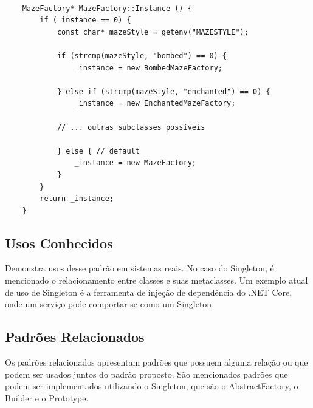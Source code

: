 \begin{lstlisting}[caption={Exemplo de Singleton com subclasses},label=singletonsub]
    
    MazeFactory* MazeFactory::Instance () {
        if (_instance == 0) {
            const char* mazeStyle = getenv("MAZESTYLE");

            if (strcmp(mazeStyle, "bombed") == 0) {
                _instance = new BombedMazeFactory;

            } else if (strcmp(mazeStyle, "enchanted") == 0) {
                _instance = new EnchantedMazeFactory;

            // ... outras subclasses possíveis

            } else { // default
                _instance = new MazeFactory;
            }
        }
        return _instance;
    } 

\end{lstlisting}


\subsection*{Usos Conhecidos}

Demonstra usos desse padrão em sistemas reais. No caso 
do Singleton, é mencionado o relacionamento entre 
classes e suas metaclasses. Um exemplo atual de uso 
de Singleton é a ferramenta de injeção de dependência 
do .NET Core, onde um serviço 
pode comportar-se como um Singleton\cite{didotnet}.

\subsection*{Padrões Relacionados}

Os padrões relacionados apresentam padrões que 
possuem alguma relação ou que podem ser usados juntos 
do padrão proposto. São mencionados padrões que 
podem ser implementados utilizando o Singleton, que 
são o AbstractFactory, o Builder e o Prototype.

